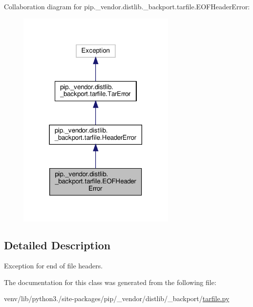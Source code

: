 Collaboration diagram for pip.\+\_\+vendor.\+distlib.\+\_\+backport.\+tarfile.\+E\+O\+F\+Header\+Error\+:
\nopagebreak
\begin{figure}[H]
\begin{center}
\leavevmode
\includegraphics[width=222pt]{classpip_1_1__vendor_1_1distlib_1_1__backport_1_1tarfile_1_1EOFHeaderError__coll__graph}
\end{center}
\end{figure}


\subsection{Detailed Description}
\begin{DoxyVerb}Exception for end of file headers.\end{DoxyVerb}
 

The documentation for this class was generated from the following file\+:\begin{DoxyCompactItemize}
\item 
venv/lib/python3./site-\/packages/pip/\+\_\+vendor/distlib/\+\_\+backport/\hyperlink{tarfile_8py}{tarfile.\+py}\end{DoxyCompactItemize}
